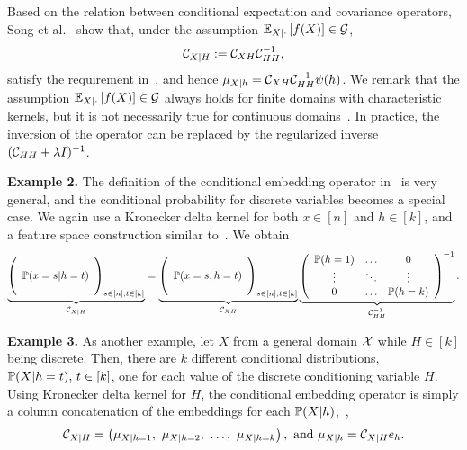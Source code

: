 \documentclass[11pt]{article}
\begin{document}
Based on the relation between conditional expectation and covariance operators, Song et al. \, \cite{SonHuaSmoFuk09} show that, under the assumption $\mathbb{E}_{X|\cdot} \left[f(X)\right]\in\mathcal{G}$,
\begin{align}
    \label{eq:conditionalembeddingoperator}
    \mathcal{C}_{X|H}:=\mathcal{C}_{XH}\mathcal{C}_{HH}^{-1},
\end{align}
satisfy the requirement in~, and
hence $\mu_{X|h} = \mathcal{C}_{XH} \mathcal{C}_{HH}^{-1} \psi(h)$.
We remark that the assumption $\mathbb{E}_{X|\cdot} \left[f(X)\right]\in\mathcal{G}$ always holds for finite domains with characteristic kernels, but it is not necessarily true for continuous domains~\cite{FukBacJor04}.
In practice, the inversion of the operator can be replaced by the regularized inverse $(\mathcal{C}_{HH}+\lambda I)^{-1}$.

{\bf Example 2.} The definition of the conditional embedding operator in~ is very general, and the conditional probability for discrete variables becomes a special case. We again use a Kronecker delta kernel for both $x\in [n]$ and $h\in [k]$, and a feature space construction similar to~. We obtain
\begin{align*}
    \underbrace{\left(
        \begin{array}{c}
            \cr
            \mathbb{P}(x=s|h=t) \cr
            \cr
        \end{array}
    \right)_{s\in[n],t\in[k]}}_{\mathcal{C}_{X|H}}
    =
    \underbrace{
    \left(
        \begin{array}{c}
            \cr
            \mathbb{P}(x=s, h=t) \cr
            \cr
        \end{array}
    \right)_{s\in[n],t\in[k]}}_{\mathcal{C}_{XH}}
    \underbrace{
    \left(
        \begin{array}{ccc}
            \mathbb{P}(h=1) & \ldots & 0 \cr
            \vdots &  \ddots & \vdots \cr
            0 & \ldots & \mathbb{P}(h=k)
        \end{array}
    \right)^{\Large -1}}_{\mathcal{C}_{HH}^{-1}}. \label{eq:conditionalprobabilitytable}
\end{align*}

{\bf Example 3.} As another example, let $X$ from a general domain $\mathcal{X}$ while $H\in[k]$ being discrete. Then, there are $k$ different conditional distributions, $\mathbb{P}(X|h=t),\,t\in[k]$, one for each value of the discrete conditioning variable $H$. Using Kronecker delta kernel for $H$, the conditional embedding operator is simply a column concatenation of the embeddings for each $\mathbb{P}(X|h)$,~\ie,
\begin{align}
  \Ccal_{X|H} = \rbr{\mu_{X|h=1},\ \mu_{X|h=2},\ \ldots,\ \mu_{X|h=k}},~\text{and}~\mu_{X|h} = \Ccal_{X|H} e_h.
\end{align}
\end{document}
